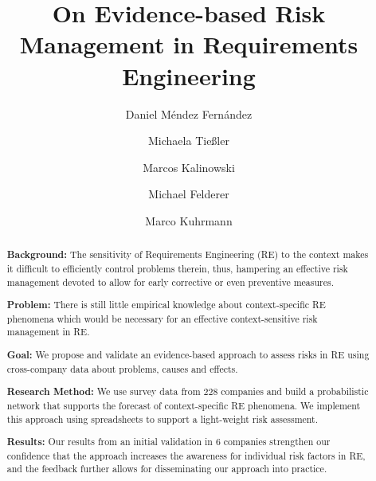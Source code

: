 \documentclass[lnbip]{svmultln}
\begin{document}
%
\mainmatter              %
%
\title{On Evidence-based Risk Management in Requirements Engineering}
%
%
\author{Daniel M\'{e}ndez Fern\'{a}ndez  \and Michaela Tie{\ss}ler \and Marcos Kalinowski \and Michael Felderer \and Marco Kuhrmann }
%

%

\maketitle              %

\begin{abstract}       


\textbf{Background:} The sensitivity of Requirements Engineering (RE) to the context makes it difficult to efficiently control problems therein, thus, hampering an effective risk management devoted to allow for early corrective or even preventive measures.
 
\textbf{Problem:} There is still little empirical knowledge about context-specific RE phenomena which would be necessary for an effective context-sensitive risk management in RE.

\textbf{Goal:} We propose and validate an evidence-based approach to assess risks in RE using cross-company data about problems, causes and effects. 

\textbf{Research Method:} We use survey data from 228 companies and build a probabilistic network that supports the forecast of context-specific RE phenomena. We implement this approach using spreadsheets to support a light-weight risk assessment. 

\textbf{Results:} Our results from an initial validation in 6 companies strengthen our confidence that the approach increases the awareness for individual risk factors in RE, and the feedback further allows for disseminating our approach into practice.


\end{abstract}
%
\end{document}
